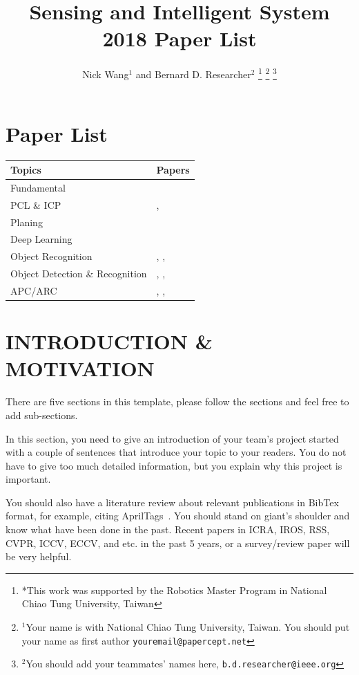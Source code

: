 \documentclass[letterpaper, 10 pt, conference]{ieeeconf}  %
\title{\LARGE \bf
Sensing and Intelligent System 2018 Paper List
}
\author{Nick Wang$^{1}$ and Bernard D. Researcher$^{2}$%
\thanks{*This work was supported by the Robotics Master Program in National Chiao Tung University, Taiwan}%
\thanks{$^{1}$Your name is with National Chiao Tung University, Taiwan. You should put your name as first author
        {\tt\small youremail@papercept.net}}%
\thanks{$^{2}$You should add your teammates' names here,
        {\tt\small b.d.researcher@ieee.org}}%
}
\begin{document}
\maketitle
\thispagestyle{empty}
\pagestyle{empty}

\section{Paper List}

\begin{tabular}{ll}
\hline
Topics & Papers \\
\hline 
Fundamental & \cite{olson2011apriltag} \\
PCL \& ICP & \cite{rusu20113d}, \cite{pomerleau2013comparing} \\
Planing & \cite{kuffner2000rrt} \\
Deep Learning & \cite{lecun2015deep} \\
Object Recognition & \cite{krizhevsky2012imagenet}, \cite{simonyan2014very}, \cite{he2016deep} \\
Object Detection \& Recognition & \cite{long2015fully} \cite{ren2015faster}, \cite{redmon2017yolo9000}, \cite{liu2016ssd} \\
APC/ARC & \cite{zeng2016multi}, \cite{zeng2018robotic}, \cite{hernandez2016team} \\
\hline
\end{tabular}

\section{INTRODUCTION \& MOTIVATION}

There are five sections in this template, please follow the sections and feel free to add sub-sections. 

In this section, you need to give an introduction of your team's project started with a couple of sentences that introduce your topic to your readers. You do not have to give too much detailed information, but you explain why this project is important.

You should also have a literature review about relevant publications in BibTex format, for example, citing AprilTags~\cite{olson2011apriltag}. You should stand on giant's shoulder and know what have been done in the past. Recent papers in ICRA, IROS, RSS, CVPR, ICCV, ECCV, and etc. in the past 5 years, or a survey/review paper will be very helpful.
\end{document}
